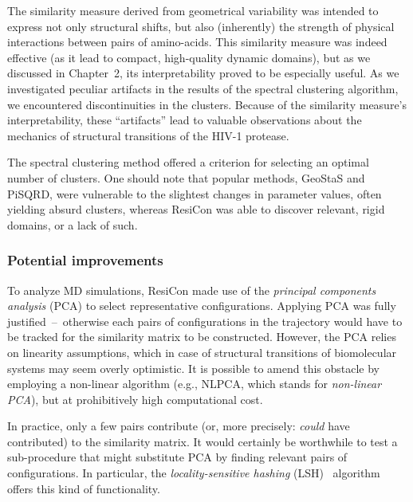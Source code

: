 \documentclass[a4paper,11pt,twoside]{book}%
\begin{document}
The similarity measure derived from geometrical variability was intended to express not only structural shifts, but also (inherently) the strength of physical interactions between pairs of amino-acids.
This similarity measure was indeed effective (as it lead to compact, high-quality dynamic domains), but as we discussed in Chapter~2, its interpretability proved to be especially useful.
As we investigated peculiar artifacts in the results of the spectral clustering algorithm, we encountered discontinuities in the clusters.
Because of the similarity measure's interpretability, these ``artifacts'' lead to valuable observations about the mechanics of structural transitions of the HIV-1 protease.

The spectral clustering method offered a criterion for selecting an optimal number of clusters.
One should note that popular methods, GeoStaS and PiSQRD, were vulnerable to the slightest changes in parameter values, often yielding absurd clusters, whereas ResiCon was able to discover relevant, rigid domains, or a lack of such.


\subsubsection{Potential improvements}

To analyze MD simulations, ResiCon made use of the \emph{principal components analysis} (PCA) to select representative configurations. %
Applying PCA was fully justified~--~otherwise each pairs of configurations in the trajectory would have to be tracked for the similarity matrix to be constructed.
However, the PCA relies on linearity assumptions, which in case of structural transitions of biomolecular systems may seem overly optimistic.
It is possible to amend this obstacle by employing a non-linear algorithm (e.g., NLPCA, which stands for \emph{non-linear PCA}), but at prohibitively high computational cost.

In practice, only a few pairs contribute (or, more precisely: \emph{could} have contributed) to the similarity matrix.
It would certainly be worthwhile to test a sub-procedure that might substitute PCA by finding relevant pairs of configurations.
In particular, the \emph{locality-sensitive hashing} (LSH)~\cite{gionis1999similarity} algorithm offers this kind of functionality.
\end{document}
